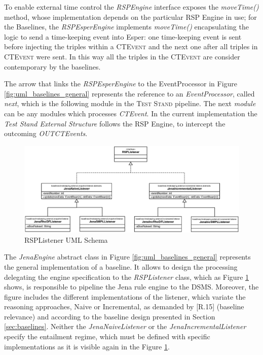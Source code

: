 To enable external time control the \textit{RSPEngine} interface exposes the \textit{moveTime()} method, whose implementation depends on the particular RSP Engine in use; for the Baselines, the \textit{RSPEsperEngine} implements \textit{moveTime()} encapsulating the logic to send a time-keeping event into Esper: one time-keeping event is sent before injecting the triples within a \textsc{CTEvent} and the next one after all triples in \textsc{CTEvent} were sent. In this way all the triples in the \textsc{CTEvent} are consider contemporary by the baselines. 

The arrow that links the \textit{RSPEsperEngine} to the EventProcessor in Figure \ref{fig:uml_baselines_general} represents the reference to an \textit{EventProcessor}, called \textit{next}, which is the following module in the \textsc{Test Stand} pipeline. The next \textit{module} can be any modules which processes \textit{CTEvent}. In the current implementation the \textit{Test Stand External Structure } follows the RSP Engine, to intercept the outcoming \textit{OUTCTEvents}.

\begin{figure}[tbh]
  \centering
	\includegraphics[width=\linewidth]{images/uml_baselines_listener}
	\caption{RSPListener UML Schema} 
  	\label{fig:uml_baselines_listener}
\end{figure}

The \textit{JenaEngine} abstract class in Figure \ref{fig:uml_baselines_general} represents the general implementation of a baseline. It allows to design the processing delegating the engine specification to  the \textit{RSPListener} class, which as  Figure \ref{fig:uml_baselines_listener} shows, is responsible to pipeline the Jena rule engine to the DSMS. Moreover, the figure includes the different implementations of the listener, which variate the reasoning approaches, Naive or Incremental, as demanded by [R.15] (baseline relevance) and according to the baseline design presented in Section \ref{sec:baselines}. Neither the \textit{JenaNaiveListener} or the \textit{JenaIncrementalListener} specify the entailment regime, which must be defined with specific implementations as it is visible again in the Figure \ref{fig:uml_baselines_listener}.

